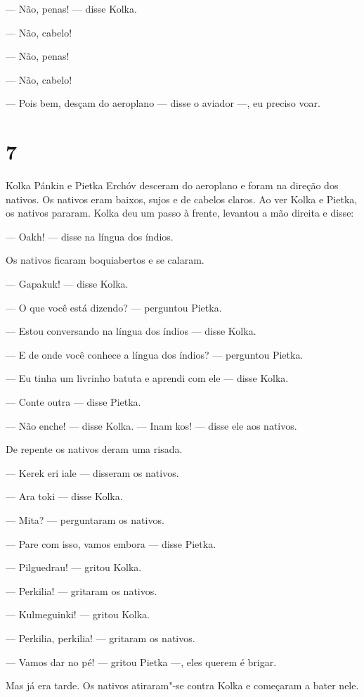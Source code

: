 --- Não, penas! --- disse Kolka.

--- Não, cabelo!

--- Não, penas!

--- Não, cabelo!

--- Pois bem, desçam do aeroplano --- disse o aviador ---, eu preciso
voar.

\section{7}

Kolka Pánkin e Pietka Erchóv desceram do aeroplano e fo­ram na direção
dos nativos. Os nativos eram baixos, sujos e de cabelos claros. Ao ver
Kolka e Pietka, os nativos pararam. Kolka deu um passo à frente,
levantou a mão direita e disse:

--- Oakh! --- disse na língua dos índios.

Os nativos ficaram boquiabertos e se calaram.

--- Gapakuk! --- disse Kolka.

--- O que você está dizendo? --- perguntou Pietka.

--- Estou conversando na língua dos índios --- disse Kolka.

--- E de onde você conhece a língua dos índios? --- perguntou Pietka.

--- Eu tinha um livrinho batuta e aprendi com ele --- disse Kolka.

--- Conte outra --- disse Pietka.

--- Não enche! --- disse Kolka. --- Inam kos! --- disse ele aos
na­tivos.

De repente os nativos deram uma risada.

--- Kerek eri iale --- disseram os nativos.

--- Ara toki --- disse Kolka.

--- Mita? --- perguntaram os nativos.

--- Pare com isso, vamos embora --- disse Pietka.

--- Pilguedrau! --- gritou Kolka.

--- Perkilia! --- gritaram os nativos.

--- Kulmeguinki! --- gritou Kolka.

--- Perkilia, perkilia! --- gritaram os nativos.

--- Vamos dar no pé! --- gritou Pietka ---, eles querem é brigar.

Mas já era tarde. Os nativos atiraram"-se contra Kolka e co­meçaram a
bater nele.


